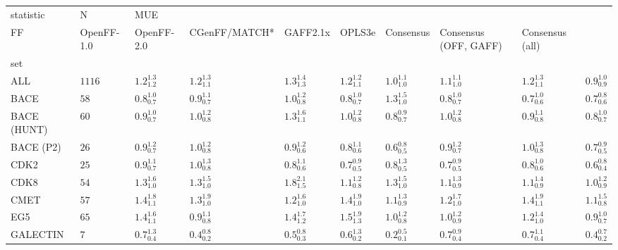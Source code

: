 \begin{tabular}{llllllllll}
\toprule
statistic &       N & \multicolumn{8}{l}{MUE} \\
FF &         OpenFF-1.0 &         OpenFF-2.0 &      CGenFF/MATCH* &           GAFF2.1x &             OPLS3e &          Consensus & Consensus (OFF, GAFF) &    Consensus (all) \\
set         &         &                    &                    &                    &                    &                    &                    &                       &                    \\
\midrule
ALL         &  $1116$ &  $1.2_{1.2}^{1.3}$ &  $1.2_{1.1}^{1.3}$ &  $1.3_{1.3}^{1.4}$ &  $1.2_{1.1}^{1.2}$ &  $1.0_{1.0}^{1.1}$ &  $1.1_{1.0}^{1.1}$ &     $1.2_{1.1}^{1.3}$ &  $0.9_{0.9}^{1.0}$ \\
BACE        &    $58$ &  $0.8_{0.7}^{1.0}$ &  $0.9_{0.7}^{1.1}$ &  $1.0_{0.8}^{1.2}$ &  $0.8_{0.7}^{1.0}$ &  $1.3_{1.0}^{1.5}$ &  $0.8_{0.7}^{1.0}$ &     $0.7_{0.6}^{1.0}$ &  $0.7_{0.6}^{0.8}$ \\
BACE (HUNT) &    $60$ &  $0.9_{0.7}^{1.0}$ &  $1.0_{0.8}^{1.2}$ &  $1.3_{1.1}^{1.6}$ &  $1.0_{0.8}^{1.2}$ &  $0.8_{0.7}^{0.9}$ &  $1.0_{0.8}^{1.2}$ &     $0.9_{0.8}^{1.1}$ &  $0.8_{0.7}^{1.0}$ \\
BACE (P2)   &    $26$ &  $0.9_{0.7}^{1.2}$ &  $1.0_{0.8}^{1.2}$ &  $0.9_{0.6}^{1.2}$ &  $0.8_{0.6}^{1.1}$ &  $0.6_{0.5}^{0.8}$ &  $0.9_{0.7}^{1.2}$ &     $1.0_{0.8}^{1.3}$ &  $0.7_{0.5}^{0.9}$ \\
CDK2        &    $25$ &  $0.9_{0.7}^{1.1}$ &  $1.0_{0.8}^{1.3}$ &  $0.8_{0.6}^{1.1}$ &  $0.7_{0.5}^{0.9}$ &  $0.8_{0.5}^{1.3}$ &  $0.7_{0.5}^{0.9}$ &     $0.8_{0.6}^{1.0}$ &  $0.6_{0.4}^{0.8}$ \\
CDK8        &    $54$ &  $1.3_{1.0}^{1.6}$ &  $1.3_{1.0}^{1.5}$ &  $1.8_{1.5}^{2.1}$ &  $1.1_{0.8}^{1.2}$ &  $1.3_{1.0}^{1.5}$ &  $1.1_{0.9}^{1.3}$ &     $1.1_{0.9}^{1.4}$ &  $1.0_{0.9}^{1.2}$ \\
CMET        &    $57$ &  $1.4_{1.1}^{1.8}$ &  $1.3_{1.0}^{1.9}$ &  $1.2_{1.0}^{1.6}$ &  $1.4_{1.0}^{1.9}$ &  $1.1_{0.9}^{1.3}$ &  $1.2_{1.0}^{1.7}$ &     $1.4_{1.1}^{1.9}$ &  $1.1_{0.8}^{1.5}$ \\
EG5         &    $65$ &  $1.4_{1.1}^{1.6}$ &  $0.9_{0.8}^{1.1}$ &  $1.4_{1.2}^{1.7}$ &  $1.5_{1.3}^{1.9}$ &  $1.0_{0.8}^{1.2}$ &  $1.0_{0.9}^{1.2}$ &     $1.2_{1.0}^{1.4}$ &  $0.9_{0.7}^{1.0}$ \\
GALECTIN    &     $7$ &  $0.7_{0.4}^{1.3}$ &  $0.4_{0.2}^{0.8}$ &  $0.5_{0.3}^{0.8}$ &  $0.6_{0.2}^{1.3}$ &  $0.2_{0.1}^{0.5}$ &  $0.7_{0.4}^{0.9}$ &     $0.7_{0.4}^{1.1}$ &  $0.4_{0.2}^{0.7}$ \\

\end{tabular}

